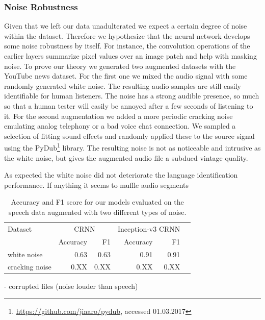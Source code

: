\subsubsection{Noise Robustness} 
\label{sec:noise_robustness}
Given that we left our data unadulterated we expect a certain degree of noise within the dataset. Therefore we hypothesize that the neural network develops some noise robustness by itself. For instance, the convolution operations of the earlier layers summarize pixel values over an image patch and help with masking noise. To prove our theory we generated two augmented datasets with the YouTube news dataset. 
For the first one we mixed the audio signal with some randomly generated white noise. The resulting audio samples are still easily identifiable for human listeners. The noise has a strong audible presence, so much so that a human tester will easily be annoyed after a few seconds of listening to it.
For the second augmentation we added a more periodic cracking noise emulating analog telephony or a bad voice chat connection. We sampled a selection of fitting sound effects and randomly applied these to the source signal using the PyDub\footnote{\url{https://github.com/jiaaro/pydub}, accessed 01.03.2017} library. The resulting noise is not as noticeable and intrusive as the white noise, but gives the augmented audio file a subdued vintage quality.

As expected the white noise did not deteriorate the language identification performance. If anything it seems to muffle audio segments 
 
	\begin{table}[]
	\centering
	\begin{tabularx}{\textwidth}{lrrrrr}
	\toprule
	Dataset & \multicolumn{2}{c}{CRNN} & \multicolumn{2}{c}{Inception-v3 CRNN} \\  
                & Accuracy  & F1    & Accuracy  & F1   \\ \midrule
white noise     & 0.63      & 0.63  & 0.91      & 0.91 \\
cracking noise  & 0.XX      & 0.XX  & 0.XX      & 0.XX \\
 	\bottomrule
	\end{tabularx}
	\caption{Accuracy and F1 score for our models evaluated on the speech data augmented with two different types of noise.}
	\label{tab:audio_duration}
	\end{table}

- corrupted files (noise louder than speech)

